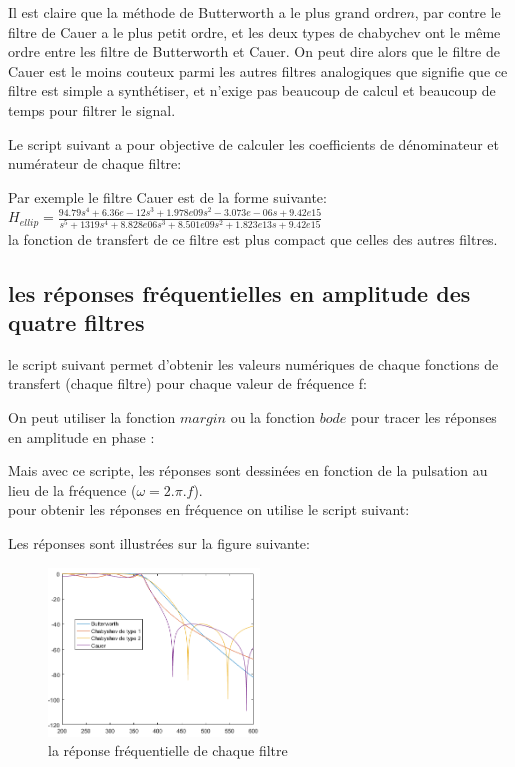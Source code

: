 \documentclass[twoside,twocolumn]{article}
\begin{document}
Il est claire que la méthode de Butterworth a le plus grand ordre$n$, par contre le filtre de Cauer a le plus petit ordre, et les deux types de chabychev ont le même ordre entre les filtre de Butterworth et Cauer.
 On peut dire alors que le filtre de Cauer est le moins couteux parmi les autres filtres analogiques que signifie que ce filtre est simple a synthétiser, et n'exige pas beaucoup de calcul et beaucoup de temps pour filtrer le signal.

Le script suivant a pour objective de calculer les coefficients de dénominateur et numérateur de chaque filtre:

\label{matlab}


Par exemple le filtre Cauer est de la forme suivante:\\ 

$H_{ellip} = \frac{94.79 s^4 + 6.36e-12 s^3 + 1.978e09 s^2 - 3.073e-06 s + 9.42e15}{  s^5 + 1319 s^4 + 8.828e06 s^3 + 8.501e09 s^2 + 1.823e13 s + 9.42e15}$\\

la fonction de transfert de ce filtre est plus compact que celles des autres filtres.

\subsection{les réponses fréquentielles en amplitude des quatre filtres}

le script suivant permet d'obtenir les valeurs numériques de chaque fonctions de transfert (chaque filtre) pour chaque valeur de fréquence f:


\label{matlab}


	On peut utiliser la fonction $margin$ ou la fonction $bode$  pour tracer les réponses en amplitude  en phase :
	\label{matlab}

	Mais avec ce scripte, les réponses sont dessinées en fonction de la pulsation au lieu de la fréquence ($\omega = 2.\pi.f$).\\
	pour obtenir les réponses en fréquence on utilise  le script suivant:
	
	\label{matlab}


Les réponses sont illustrées sur la figure suivante:
\begin{figure}[H]
\centering
\includegraphics[width=0.5\textwidth]{Images/3.png}
\caption{ la réponse fréquentielle de chaque filtre}
\end{figure}
\end{document}

